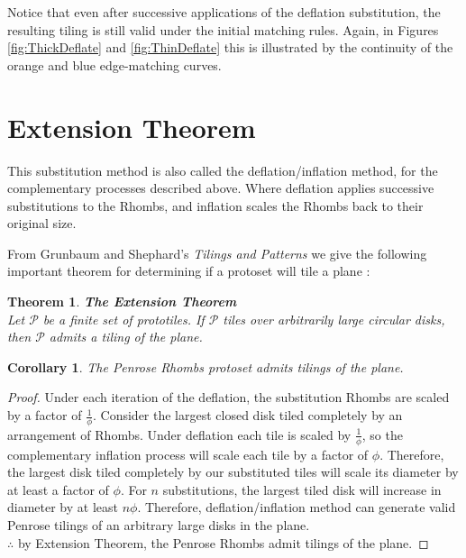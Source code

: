 \documentclass[
  oneside,
  11pt, a4paper,
  footinclude=true,
  headinclude=true,
  cleardoublepage=empty
]{scrbook}
\newtheorem{mythm}{Theorem}
\newtheorem{mycor}{Corollary}
\begin{document}
Notice that even after successive applications of the deflation substitution, the resulting tiling is still valid under the initial matching rules. Again, in Figures \ref{fig:ThickDeflate} and \ref{fig:ThinDeflate} this is illustrated by the continuity of the orange and blue edge-matching curves.

\section{Extension Theorem}
This substitution method is also called the deflation/inflation method, for the complementary processes described above. Where deflation applies successive substitutions to the Rhombs, and inflation scales the Rhombs back to their original size.

From Grunbaum and Shephard's \textit{Tilings and Patterns} we give the following important theorem for determining if a protoset will tile a plane \cite{Grunbaum1986}:
\begin{mythm}
\textbf{The Extension Theorem\\}
Let $\mathcal{P}$ be a finite set of prototiles. If $\mathcal{P}$ tiles over arbitrarily large circular disks, then $\mathcal{P}$ admits a tiling of the plane. \cite{Grunbaum1986,Ross}
\end{mythm}

\begin{mycor}
The Penrose Rhombs protoset admits tilings of the plane.
\end{mycor}

\begin{proof}
Under each iteration of the deflation, the substitution Rhombs are scaled by a factor of $\frac{1}{\phi}$. Consider the largest closed disk tiled completely by an arrangement of Rhombs. Under deflation each tile is scaled by  $\frac{1}{\phi}$, so the complementary inflation process will scale each tile by a factor of $\phi$. Therefore, the largest disk tiled completely by our substituted tiles will scale its diameter by at least a factor of $\phi$. For $n$ substitutions, the largest tiled disk will increase in diameter by at least $n\phi$. Therefore, deflation/inflation method can generate valid Penrose tilings of an arbitrary large disks in the plane.\\
$\therefore$ by Extension Theorem, the Penrose Rhombs admit tilings of the plane. 
\end{proof}
\end{document}
